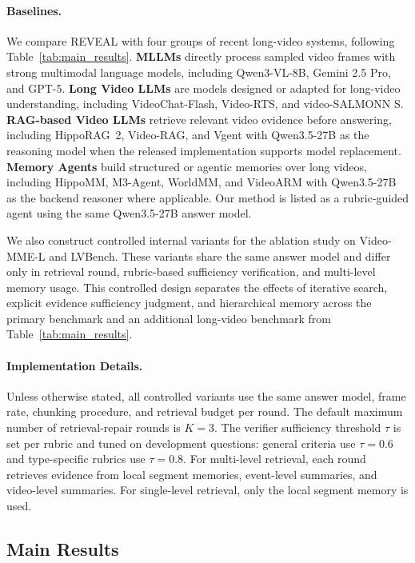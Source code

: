 \documentclass[letterpaper]{article} %
\begin{document}
\paragraph{Baselines.}
We compare REVEAL with four groups of recent long-video systems, following Table~\ref{tab:main_results}. 
\textbf{MLLMs} directly process sampled video frames with strong multimodal language models, including Qwen3-VL-8B, Gemini 2.5 Pro, and GPT-5.
\textbf{Long Video LLMs} are models designed or adapted for long-video understanding, including VideoChat-Flash, Video-RTS, and video-SALMONN S.
\textbf{RAG-based Video LLMs} retrieve relevant video evidence before answering, including HippoRAG~2, Video-RAG, and Vgent with Qwen3.5-27B as the reasoning model when the released implementation supports model replacement.
\textbf{Memory Agents} build structured or agentic memories over long videos, including HippoMM, M3-Agent, WorldMM, and VideoARM with Qwen3.5-27B as the backend reasoner where applicable. Our method is listed as a rubric-guided agent using the same Qwen3.5-27B answer model.

We also construct controlled internal variants for the ablation study on Video-MME-L and LVBench. These variants share the same answer model and differ only in retrieval round, rubric-based sufficiency verification, and multi-level memory usage. This controlled design separates the effects of iterative search, explicit evidence sufficiency judgment, and hierarchical memory across the primary benchmark and an additional long-video benchmark from Table~\ref{tab:main_results}.

\paragraph{Implementation Details.}
Unless otherwise stated, all controlled variants use the same answer model, frame rate, chunking procedure, and retrieval budget per round. The default maximum number of retrieval-repair rounds is $K=3$. The verifier sufficiency threshold $\tau$ is set per rubric and tuned on development questions: general criteria use $\tau=0.6$ and type-specific rubrics use $\tau=0.8$. For multi-level retrieval, each round retrieves evidence from local segment memories, event-level summaries, and video-level summaries. For single-level retrieval, only the local segment memory is used.

\subsection{Main Results}
\end{document}
